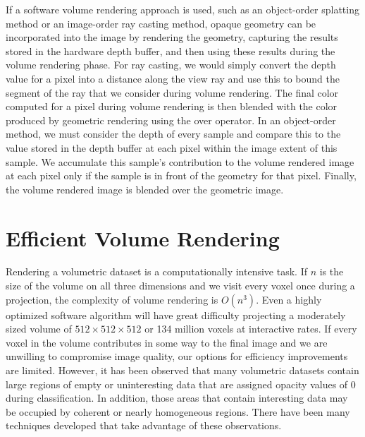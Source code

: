 If a software volume rendering approach is used, such as an object-order splatting method or an image-order ray casting method, opaque geometry can be incorporated into the image by rendering the geometry, capturing the results stored in the hardware depth buffer, and then using these results during the volume rendering phase. For ray casting, we would simply convert the depth value for a pixel into a distance along the view ray and use this to bound the segment of the ray that we consider during volume rendering. The final color computed for a pixel during volume rendering is then blended with the color produced by geometric rendering using the over operator. In an object-order method, we must consider the depth of every sample and compare this to the value stored in the depth buffer at each pixel within the image extent of this sample. We accumulate this sample's contribution to the volume rendered image at each pixel only if the sample is in front of the geometry for that pixel. Finally, the volume rendered image is blended over the geometric image.

\section{Efficient Volume Rendering}

Rendering a volumetric dataset is a computationally intensive task. If $n$ is the size of the volume on all three dimensions and we visit every voxel once during a projection, the complexity of volume rendering is $O(n^3)$. Even a highly optimized software algorithm will have
great difficulty projecting a moderately sized volume of $512 \times 512 \times 512$ or 134 million voxels at interactive rates. If every voxel in the volume contributes in some way to the final image and we are unwilling to compromise image quality, our options for efficiency improvements are limited. However, it has been observed that many volumetric datasets contain large regions of empty or uninteresting data that are assigned opacity values of $0$ during classification. In addition, those areas that contain interesting data may be occupied by coherent or nearly homogeneous regions. There have been many techniques developed that take advantage of these observations.

